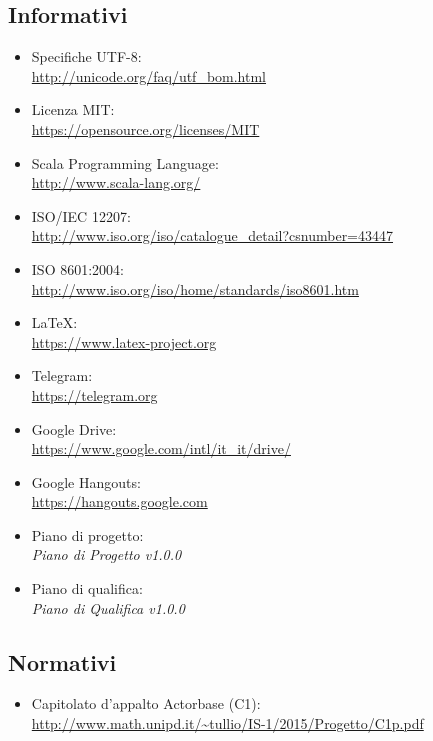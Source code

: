\documentclass[a4paper]{report}
\begin{document}
	\subsection{Informativi}
	\begin{itemize}
		\item Specifiche UTF-8: \\ \url{http://unicode.org/faq/utf_bom.html}
		\item Licenza MIT: \\ \url{https://opensource.org/licenses/MIT}
		\item Scala Programming Language: \\ \url{http://www.scala-lang.org/}
		\item ISO/IEC 12207: \\ \url{http://www.iso.org/iso/catalogue_detail?csnumber=43447}
		\item ISO 8601:2004: \\ \url{http://www.iso.org/iso/home/standards/iso8601.htm}
		\item \LaTeX{}: \\ \url{https://www.latex-project.org}
		\item Telegram: \\ \url{https://telegram.org}
		\item Google Drive: \\ \url{https://www.google.com/intl/it_it/drive/}
		\item Google Hangouts: \\ \url{https://hangouts.google.com}
		\item Piano di progetto: \\ \emph{Piano di Progetto v1.0.0}
		\item Piano di qualifica: \\ \emph{Piano di Qualifica v1.0.0}
	\end{itemize}
	\subsection{Normativi}
		\begin{itemize}
			\item Capitolato d'appalto Actorbase (C1): \\ 
			\url{http://www.math.unipd.it/~tullio/IS-1/2015/Progetto/C1p.pdf}
		\end{itemize}
\end{document}
